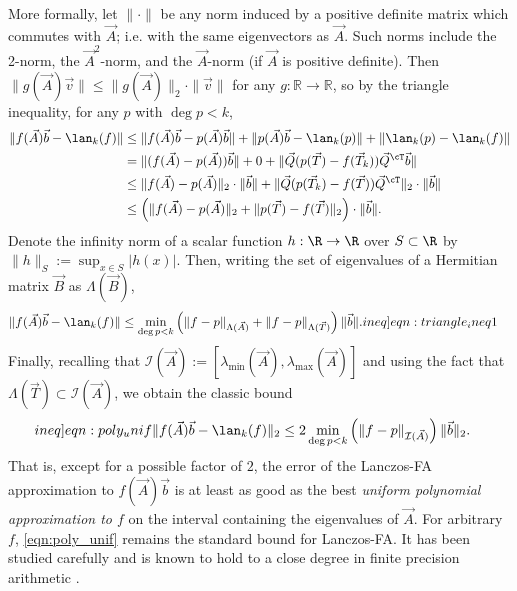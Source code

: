 More formally, let \( \| \cdot \| \) be any norm induced by a positive definite matrix which commutes with $\vec{A}$; i.e. with the same eigenvectors as $\vec{A}$. Such norms include the 2-norm, the $\vec{A}^2$-norm, and the $\vec{A}$-norm (if $\vec{A}$ is positive definite).
Then \( \| g(\vec{A}) \vec{v} \| \leq \| g(\vec{A}) \|_2 \cdot \| \vec{v} \| \) for any \( g : \mathbb{R}\to\mathbb{R} \), so by the triangle inequality, for any \( p \) with \( \deg p < k \),
\begin{align*}
\| f(\vec{A}) \vec{b} - \lan_k(f) \|
& \leq \| f( \vec{A} ) \vec{b} - p( \vec{A} ) \vec{b} \| + \| p( \vec{A} ) \vec{b} - \lan_k (p) \| + \| \lan_k (p) - \lan_k (f) \| 
\\& = \| (f( \vec{A} ) - p( \vec{A} ) )\vec{b} \| + 0 + \| \vec{Q} ( p( \vec{T} ) - f( \vec{T}_k ) ) \vec{Q}^{\cT} \vec{b} \| 
\\& \le \| f( \vec{A} ) - p( \vec{A} ) \|_2 \cdot \| \vec{b} \| + \| \vec{Q} ( p( \vec{T}_k ) - f( \vec{T} ) ) \vec{Q}^{\cT} \|_2 \cdot \|\vec{b} \|
\\& \le \left( \| f( \vec{A} ) - p( \vec{A} ) \|_2 + \| p(\vec{T} ) - f( \vec{T} ) \|_2 \right) \cdot \| \vec{b} \| . 
\end{align*}
Denote the infinity norm of a scalar function \( h:\R\to\R \) over \( S\subset \R \) by \( \|h\|_S  := \sup_{x\in S}| h(x)| \).
Then, writing the set of eigenvalues of a Hermitian matrix \( \vec{B} \) as \( \Lambda(\vec{B}) \),
\begin{align}
\| f(\vec{A}) \vec{b} - \lan_k(f) \|
    &\leq \min_{\deg p< k} \left( \| f-p \|_{\Lambda(\vec{A})} + \| f - p \|_{\Lambda(\vec{T})} \right) \| \vec{b} \|. \label[ineq]{eqn:triangle_ineq1}
\end{align}
Finally, recalling that \(\mathcal{I}(\vec{A}) := [\lambda_{\text{min}}(\vec{A}), \lambda_{\text{max}}(\vec{A})]\) and using the fact that \( \Lambda(\vec{T}) \subset \mathcal{I}(\vec{A}) \), we obtain the classic bound
\begin{align}
\label[ineq]{eqn:poly_unif}
\| f(\vec{A}) \vec{b} - \lan_k(f) \|_2 
    &\leq  2 \min_{\deg p<k} \left( \| f-p \|_{\mathcal{I}(\vec{A})}  \right) \| \vec{b} \|_2.
\end{align}
That is, except for a possible factor of \( 2 \), the error of the Lanczos-FA approximation to \( f( \vec{A} ) \vec{b} \) is at least as good as the best \emph{uniform polynomial approximation to \( f \)} on the interval containing the eigenvalues of \( \vec{A} \).
For arbitrary \( f \), \cref{eqn:poly_unif} remains the standard bound for Lanczos-FA. 
It has been studied carefully and is known to hold to a close degree in finite precision arithmetic \cite{musco_musco_sidford_18}.


